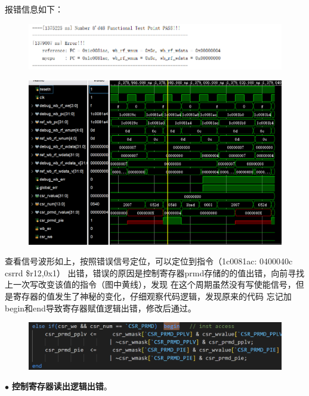 \documentclass[11pt]{article}
\begin{document}
  报错信息如下：
  \begin{figure}[H]
    \centering
    \includegraphics[width=15cm]{fig/6.png}
  \end{figure}
  \begin{figure}[H]
    \centering
    \includegraphics[width=15cm]{fig/7.png}
  \end{figure}
  查看信号波形如上，按照错误信号定位，可以定位到指令（1c0081ac:	0400040c 	csrrd	\$r12,0x1）
  出错，错误的原因是控制寄存器prmd存储的的值出错，向前寻找上一次写改变该值的指令（图中黄线），发现
  在这个周期虽然没有写使能信号，但是寄存器的值发生了神秘的变化，仔细观察代码逻辑，发现原来的代码
  忘记加begin和end导致寄存器赋值逻辑出错，修改后通过。
  \begin{figure}[H]
    \centering
    \includegraphics[width=15cm]{fig/8.png}
  \end{figure}

  \noindent
    $\bullet$
    \textbf{控制寄存器读出逻辑出错}。
\end{document}
